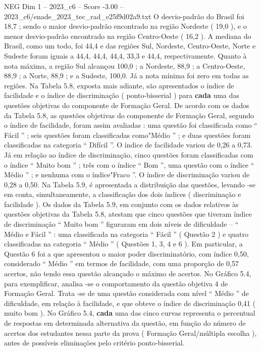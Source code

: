 \begin{textsample}{NEG Dim 1 – 2023\_c6 – Score -3.00 – 2023\_c6/enade\_2023\_tec\_rad\_e25f9d02a9.txt}
O desvio-padrão do Brasil foi 18,7 ; sendo o maior desvio-padrão encontrado na região Nordeste ( 19,0 ), e o menor desvio-padrão encontrado na região Centro-Oeste ( 16,2 ).
A mediana do Brasil, como um todo, foi 44,4 e das regiões Sul, Nordeste, Centro-Oeste, Norte e Sudeste foram iguais a 44,4, 44,4, 44,4, 33,3 e 44,4, respectivamente.
Quanto à nota máxima, a região Sul alcançou 100,0 ; a Nordeste, 88,9 ; a Centro-Oeste, 88,9 ; a Norte, 88,9 ; e a Sudeste, 100,0.
Já a nota mínima foi zero em todas as regiões.
Na Tabela 5.8, exposta mais adiante, são apresentados o índice de facilidade e o índice de discriminação ( ponto-bisserial ) para \textbf{cada} uma das questões objetivas do componente de Formação Geral.
De acordo com os dados da Tabela 5.8, as questões objetivas do componente de Formação Geral, segundo o índice de facilidade, foram assim avaliadas : uma questão foi classificada como “ Fácil ” ; seis questões foram classificadas como"Médio ” ; e duas questões foram classificadas na categoria “ Difícil ”.
O índice de facilidade variou de 0,26 a 0,73.
Já em relação ao índice de discriminação, cinco questões foram classificadas com o índice “ Muito bom ” ; três com o índice “ Bom ”, uma questão com o índice “ Médio ” ; e nenhuma com o índice"Fraco ”.
O índice de discriminação variou de 0,28 a 0,50.
Na Tabela 5.9, é apresentada a distribuição das questões, levando -se em conta, simultaneamente, a classificação dos dois índices ( discriminação e facilidade ).
Os dados da Tabela 5.9, em conjunto com os dados relativos às questões objetivas da Tabela 5.8, atestam que cinco questões que tiveram índice de discriminação “ Muito bom ” figuraram em dois níveis de dificuldade – “ Médio e Fácil ” : uma classificada na categoria “ Fácil ” ( Questão 2 ) e quatro classificadas na categoria “ Médio ” ( Questões 1, 3, 4 e 6 ).
Em particular, a Questão 6 foi a que apresentou o maior poder discriminatório, com índice 0,50, considerado “ Médio ” em termos de facilidade, com uma proporção de 0,57 acertos, não tendo essa questão alcançado o máximo de acertos.
No Gráfico 5.4, para exemplificar, analisa -se o comportamento da questão objetiva 4 de Formação Geral.
Trata -se de uma questão considerada com nível “ Médio ” de dificuldade, em relação à facilidade, e que obteve o índice de discriminação 0,41 ( muito bom ).
No Gráfico 5.4, \textbf{cada} uma das cinco curvas representa o percentual de respostas em determinada alternativa da questão, em função do número de acertos dos estudantes nessa parte da prova ( Formação Geral/múltipla escolha ), antes de possíveis eliminações pelo critério ponto-bisserial.

\end{textsample}
